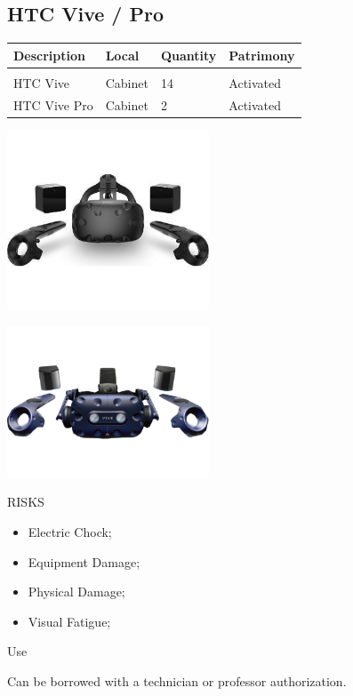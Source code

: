 \subsection{HTC Vive / Pro}
\begin{tabularx}{\textwidth}{ Y  Y  Y  Y }
    \textbf{Description} &  \textbf{Local} &  \textbf{Quantity} & \textbf{Patrimony}\\
    \hline \\
     HTC Vive & Cabinet & 14 & Activated\\
     HTC Vive Pro & Cabinet & 2 & Activated
\end{tabularx}
\vspace{1cm}

\begin{multicols}{2}

\includegraphics[width=60mm, keepaspectratio]{imgs/vive.jpg}

\includegraphics[width=60mm, keepaspectratio]{imgs/vivepro.png}

\columnbreak

\begin{mdframed}[roundcorner=10pt, linecolor=red, linewidth=2pt]
\vspace{1em}
{\Large {\color{red}RISKS}}
\vspace{1em}

\begin{itemize}
    \item Electric Chock;
    \item Equipment Damage;
    \item Physical Damage;
    \item Visual Fatigue; 
\end{itemize}

\vspace{1em}
\end{mdframed}

\vspace{2em}

{\Large Use}
\vspace{1em}

Can be borrowed with a technician or professor authorization.
\end{multicols}

